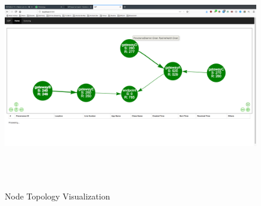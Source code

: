 \begin{figure}
    \centering
    \includegraphics[width=\textwidth,height=10cm,keepaspectratio]{figures/node_visualization.png}
    \caption{\label{fig:nodes}Node Topology Visualization}
\end{figure}

